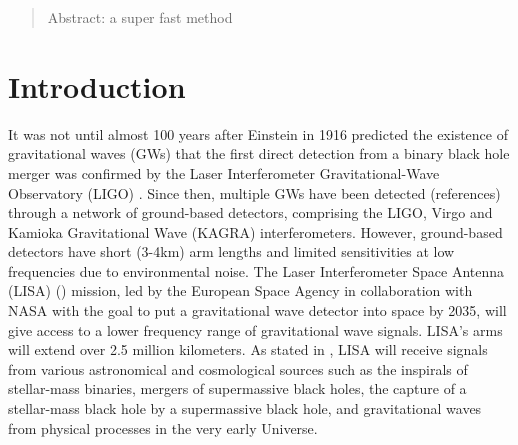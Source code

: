 \documentclass[%
 reprint,
 amsmath,amssymb,
 aps,
]{revtex4-2}
\begin{document}
\date{\today}%

\begin{abstract}
Abstract: a super fast method
\end{abstract}

\maketitle


\section{\label{sec:introduction} Introduction}





It was not until almost 100 years after Einstein in 1916 predicted the existence of gravitational waves (GWs) that the first direct detection from a binary
black hole merger was confirmed by the Laser Interferometer Gravitational-Wave Observatory (LIGO) \cite{abbott2016observation}. Since then, multiple GWs have been detected (references) through a network of ground-based detectors, comprising the LIGO, Virgo  and Kamioka Gravitational Wave (KAGRA) interferometers. However, ground-based detectors have short (3-4km) arm lengths and limited sensitivities at low frequencies due to environmental noise. The Laser Interferometer Space Antenna (LISA) (\cite{danzmann2000lisa}) mission, led by the European Space Agency in collaboration with NASA with the goal to put a gravitational wave detector into space by 2035, will give access to a lower frequency range of gravitational wave signals. LISA's arms will extend over 2.5 million kilometers. As stated in \cite{boileau2023prospects}, LISA will receive signals from various astronomical and cosmological sources such as the inspirals of stellar-mass binaries, mergers of supermassive black holes, the capture of a stellar-mass black hole by a supermassive black hole, and gravitational waves from physical processes in the very early Universe. 
\end{document}
